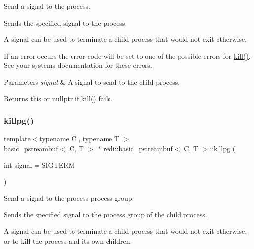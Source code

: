 Send a signal to the process. 

Sends the specified signal to the process.

A signal can be used to terminate a child process that would not exit otherwise.

If an error occurs the error code will be set to one of the possible errors for {\ttfamily \mbox{\hyperlink{classredi_1_1basic__pstreambuf_a6648f57f7aa212f986365101a66d5350}{kill()}}}. See your system\textquotesingle{}s documentation for these errors.


\begin{DoxyParams}{Parameters}
{\em signal} & A signal to send to the child process. \\
\hline
\end{DoxyParams}
\begin{DoxyReturn}{Returns}
{\ttfamily this} or {\ttfamily nullptr} if {\ttfamily \mbox{\hyperlink{classredi_1_1basic__pstreambuf_a6648f57f7aa212f986365101a66d5350}{kill()}}} fails. 
\end{DoxyReturn}
\mbox{\label{classredi_1_1basic__pstreambuf_a151b701c789459216e92bd7b76d59872}} 
\subsubsection{\texorpdfstring{killpg()}{killpg()}}
{\footnotesize\ttfamily template$<$typename C , typename T $>$ \\
\mbox{\hyperlink{classredi_1_1basic__pstreambuf}{basic\+\_\+pstreambuf}}$<$ C, T $>$ $\ast$ \mbox{\hyperlink{classredi_1_1basic__pstreambuf}{redi\+::basic\+\_\+pstreambuf}}$<$ C, T $>$\+::killpg (\begin{DoxyParamCaption}\item[{int}]{signal = {\ttfamily SIGTERM} }\end{DoxyParamCaption})\hspace{0.3cm}{\ttfamily [inline]}}



Send a signal to the process\textquotesingle{} process group. 

Sends the specified signal to the process group of the child process.

A signal can be used to terminate a child process that would not exit otherwise, or to kill the process and its own children.

